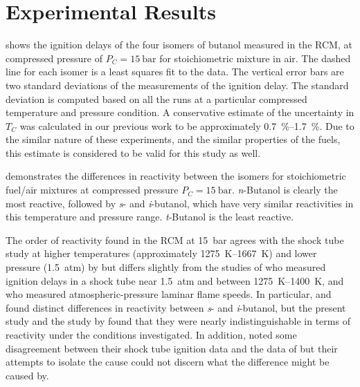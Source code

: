 \documentclass[12pt, letterpaper]{article}
\begin{document}
\section{Experimental Results}
\label{sec:buoh-expts}

 shows the ignition delays of the four isomers of
butanol measured in the RCM, at compressed pressure of $P_C=\SI{15}{\bar}$ for
stoichiometric mixture in air. The dashed line for each isomer is a least
squares fit to the data. The vertical error bars are two standard deviations
of the measurements of the ignition delay. The standard deviation is computed
based on all the runs at a particular compressed temperature and pressure
condition. A conservative estimate of the uncertainty in $T_C$ was calculated
in our previous work to be approximately \SIrange{0.7}{1.7}{\percent}. Due to the similar nature
of these experiments, and the similar properties of the fuels, this estimate
is considered to be valid for this study as well.

 demonstrates the differences in reactivity between
the isomers for stoichiometric fuel/air mixtures at compressed pressure
$P_C=\SI{15}{\bar}$. \textit{n}-Butanol is clearly the most reactive, followed by
\textit{s}- and \textit{i}-butanol, which have very similar reactivities in
this temperature and pressure range. \textit{t}-Butanol is the least reactive.

The order of reactivity found in the RCM at \SI{15}{\bar} agrees with the shock tube
study at higher temperatures (approximately \SIrange{1275}{1667}{\kelvin}) and lower pressure
(\SI{1.5}{atm}) by \textcite{Stranic2012} but differs slightly from the studies of
\textcite{Moss2008} who measured ignition delays in a shock tube near \SI{1.5}{atm}
and between \SIrange{1275}{1400}{\kelvin}, and \textcite{Veloo2011a} who measured
atmospheric-pressure laminar flame speeds. In particular, \textcite{Moss2008}
and \textcite{Veloo2011a} found distinct differences in reactivity between
\textit{s}- and \textit{i}-butanol, but the present study and the study by
\textcite{Stranic2012} found that they were nearly indistinguishable in terms
of reactivity under the conditions investigated. In addition,
\textcite{Stranic2012} noted some disagreement between their shock tube
ignition data and the data of \textcite{Moss2008} but their attempts to isolate
the cause could not discern what the difference might be caused by.
\end{document}
